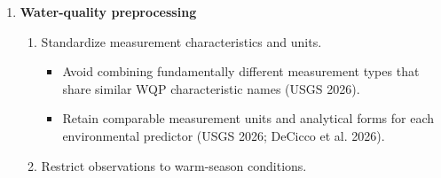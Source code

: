 \documentclass[
  letterpaper,
  DIV=11,
  numbers=noendperiod]{scrartcl}
\providecommand{\tightlist}{%
  \setlength{\itemsep}{0pt}\setlength{\parskip}{0pt}}
\begin{document}
\begin{enumerate}
\begin{enumerate}
    \begin{itemize}
    \tightlist
    \item
      Identify and acquire a suitable spatial dataset describing bottom
      characteristics.
    \item
      Document spatial resolution, substrate classes, temporal source,
      and geographic coverage.
    \item
      Suitable substrate is an important constraint on Eastern oyster
      settlement and reef development (Barnes et al. 2007; Geselbracht
      et al. 2024).
    \item
      \textbf{Add a citation for the final substrate dataset once
      selected.}
    \end{itemize}
  \item
    Existing Pensacola Bay HSI.

    \begin{itemize}
    \tightlist
    \item
      Obtain the original GIS/raster output associated with the
      Pensacola Bay HSI developed by Geselbracht et al. (Geselbracht et
      al. 2024).
    \item
      Document raster score range, coordinate reference system, extent,
      resolution, and NoData handling.
    \item
      The HSI will provide the comparison surface for evaluating
      agreement with the MaxEnt model (Geselbracht et al. 2024).
    \item
      \textbf{Add a separate dataset citation once the original HSI GIS
      product is acquired.}
    \end{itemize}
  \end{enumerate}
\item
  \textbf{Water-quality preprocessing}

  \begin{enumerate}
  \def\labelenumii{\arabic{enumii}.}
  \tightlist
  \item
    Standardize measurement characteristics and units.

    \begin{itemize}
    \tightlist
    \item
      Avoid combining fundamentally different measurement types that
      share similar WQP characteristic names (USGS 2026).
    \item
      Retain comparable measurement units and analytical forms for each
      environmental predictor (USGS 2026; DeCicco et al. 2026).
    \end{itemize}
  \item
    Restrict observations to warm-season conditions.


\end{enumerate}
\end{enumerate}
\end{document}
